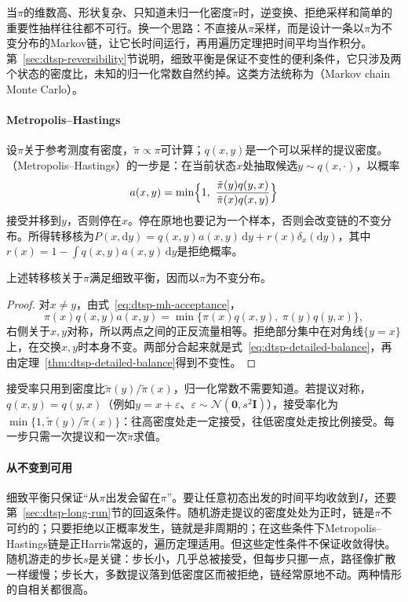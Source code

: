 当$\pi$的维数高、形状复杂、只知道未归一化密度$\tilde\pi$时，逆变换、拒绝采样和简单的重要性抽样往往都不可行。换一个思路：不直接从$\pi$采样，而是设计一条以$\pi$为不变分布的Markov链，让它长时间运行，再用遍历定理把时间平均当作积分。第~\ref{sec:dtsp-reversibility}节说明，细致平衡是保证不变性的便利条件，它只涉及两个状态的密度比，未知的归一化常数自然约掉。这类方法统称为（Markov chain Monte Carlo）。

\paragraph{Metropolis--Hastings}
设$\pi$关于参考测度有密度，$\tilde\pi\propto\pi$可计算；$q(x,y)$是一个可以采样的提议密度。（Metropolis--Hastings）的一步是：在当前状态$x$处抽取候选$y\sim q(x,\cdot)$，以概率
\begin{equation}
  a(x,y)=\min\Bigl\{1,\ \frac{\tilde\pi(y)q(y,x)}{\tilde\pi(x)q(x,y)}\Bigr\}
  \label{eq:dtsp-mh-acceptance}
\end{equation}
接受并移到$y$，否则停在$x$。停在原地也要记为一个样本，否则会改变链的不变分布。所得转移核为$P(x,\mathrm dy)=q(x,y)a(x,y)\,\mathrm dy+r(x)\delta_x(\mathrm dy)$，其中$r(x)=1-\int q(x,y)a(x,y)\,\mathrm dy$是拒绝概率。

\begin{theorem}
  \label{thm:dtsp-mh-balance}
  上述转移核关于$\pi$满足细致平衡，因而以$\pi$为不变分布。
\end{theorem}

\begin{proof}
对$x\neq y$，由式~\eqref{eq:dtsp-mh-acceptance}，
\[
  \pi(x)q(x,y)a(x,y)=\min\{\pi(x)q(x,y),\ \pi(y)q(y,x)\},
\]
右侧关于$x,y$对称，所以两点之间的正反流量相等。拒绝部分集中在对角线$\{y=x\}$上，在交换$x,y$时本身不变。两部分合起来就是式~\eqref{eq:dtsp-detailed-balance}，再由定理~\ref{thm:dtsp-detailed-balance}得到不变性。
\end{proof}

接受率只用到密度比$\tilde\pi(y)/\tilde\pi(x)$，归一化常数不需要知道。若提议对称，$q(x,y)=q(y,x)$（例如$y=x+\varepsilon$、$\varepsilon\sim\mathcal N(\bm 0,s^2\bm I)$），接受率化为$\min\{1,\tilde\pi(y)/\tilde\pi(x)\}$：往高密度处走一定接受，往低密度处走按比例接受。每一步只需一次提议和一次$\tilde\pi$求值。

\paragraph{从不变到可用}
细致平衡只保证“从$\pi$出发会留在$\pi$”。要让任意初态出发的时间平均收敛到$I$，还要第~\ref{sec:dtsp-long-run}节的回返条件。随机游走提议的密度处处为正时，链是$\pi$不可约的；只要拒绝以正概率发生，链就是非周期的；在这些条件下Metropolis--Hastings链是正Harris常返的，遍历定理适用。但这些定性条件不保证收敛得快。随机游走的步长$s$是关键：步长小，几乎总被接受，但每步只挪一点，路径像扩散一样缓慢；步长大，多数提议落到低密度区而被拒绝，链经常原地不动。两种情形的自相关都很高。

